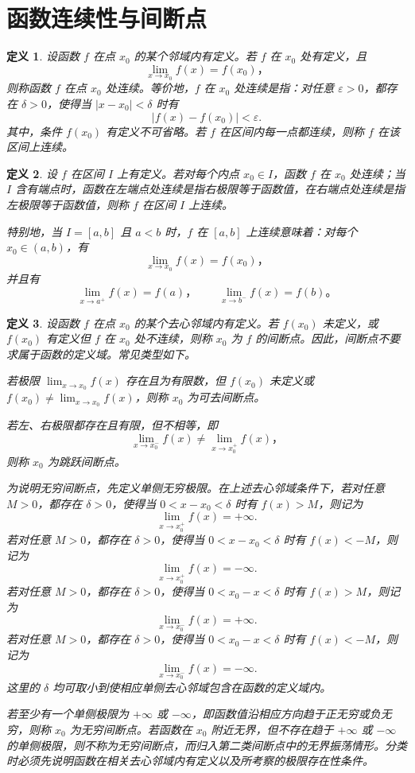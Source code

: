 \documentclass[UTF8,fontset=fandol,11pt]{ctexart}
\newtheorem{definition}{定义}[section]
\begin{document}
\section{函数连续性与间断点}\label{sec:S04}
\begin{definition}
设函数 $f$ 在点 $x_0$ 的某个邻域内有定义。若 $f$ 在 $x_0$ 处有定义，且
\[
\lim_{x\to x_0}f(x)=f(x_0)\text{，}
\]
则称函数 $f$ 在点 $x_0$ 处连续。等价地，$f$ 在 $x_0$ 处连续是指：对任意 $\varepsilon>0$，都存在 $\delta>0$，使得当 $|x-x_0|<\delta$ 时有
\[
|f(x)-f(x_0)|<\varepsilon.
\]
其中，条件 $f(x_0)$ 有定义不可省略。若 $f$ 在区间内每一点都连续，则称 $f$ 在该区间上连续。\label{def:point-continuity}
\end{definition}
\begin{definition}
设 $f$ 在区间 $I$ 上有定义。若对每个内点 $x_0\in I$，函数 $f$ 在 $x_0$ 处连续；当 $I$ 含有端点时，函数在左端点处连续是指右极限等于函数值，在右端点处连续是指左极限等于函数值，则称 $f$ 在区间 $I$ 上连续。

特别地，当 $I=[a,b]$ 且 $a<b$ 时，$f$ 在 $[a,b]$ 上连续意味着：对每个 $x_0\in(a,b)$，有
\[
\lim_{x\to x_0}f(x)=f(x_0)\text{，}
\]
并且有
\[
\lim_{x\to a^+}f(x)=f(a)\text{，}
\qquad
\lim_{x\to b^-}f(x)=f(b)\text{。}
\]
\label{def:interval-continuity}
\end{definition}
\begin{definition}
设函数 $f$ 在点 $x_0$ 的某个去心邻域内有定义。若 $f(x_0)$ 未定义，或 $f(x_0)$ 有定义但 $f$ 在 $x_0$ 处不连续，则称 $x_0$ 为 $f$ 的间断点。因此，间断点不要求属于函数的定义域。常见类型如下。

若极限 $\lim_{x\to x_0}f(x)$ 存在且为有限数，但 $f(x_0)$ 未定义或 $f(x_0)\neq\lim_{x\to x_0}f(x)$，则称 $x_0$ 为可去间断点。

若左、右极限都存在且有限，但不相等，即
\[
\lim_{x\to x_0^-}f(x)\neq\lim_{x\to x_0^+}f(x)\text{，}
\]
则称 $x_0$ 为跳跃间断点。

为说明无穷间断点，先定义单侧无穷极限。在上述去心邻域条件下，若对任意 $M>0$，都存在 $\delta>0$，使得当 $0<x-x_0<\delta$ 时有 $f(x)>M$，则记为
\[
\lim_{x\to x_0^+}f(x)=+\infty.
\]
若对任意 $M>0$，都存在 $\delta>0$，使得当 $0<x-x_0<\delta$ 时有 $f(x)<-M$，则记为
\[
\lim_{x\to x_0^+}f(x)=-\infty.
\]
若对任意 $M>0$，都存在 $\delta>0$，使得当 $0<x_0-x<\delta$ 时有 $f(x)>M$，则记为
\[
\lim_{x\to x_0^-}f(x)=+\infty.
\]
若对任意 $M>0$，都存在 $\delta>0$，使得当 $0<x_0-x<\delta$ 时有 $f(x)<-M$，则记为
\[
\lim_{x\to x_0^-}f(x)=-\infty.
\]
这里的 $\delta$ 均可取小到使相应单侧去心邻域包含在函数的定义域内。

若至少有一个单侧极限为 $+\infty$ 或 $-\infty$，即函数值沿相应方向趋于正无穷或负无穷，则称 $x_0$ 为无穷间断点。若函数在 $x_0$ 附近无界，但不存在趋于 $+\infty$ 或 $-\infty$ 的单侧极限，则不称为无穷间断点，而归入第二类间断点中的无界振荡情形。分类时必须先说明函数在相关去心邻域内有定义以及所考察的极限存在性条件。\label{def:discontinuity-types}
\end{definition}
\end{document}
